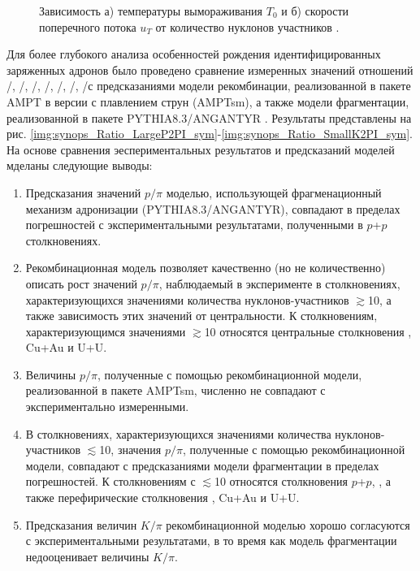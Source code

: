 \begin{figure}[ht]
	\caption{Зависимость а) температуры вымораживания $T_0$ и  б) скорости поперечного потока $u_T$ от количество нуклонов участников \Npart.}\label{fig:synops_T0ut}
\end{figure}
Для более глубокого анализа особенностей рождения идентифицированных заряженных адронов было проведено сравнение измеренных значений отношений  \pim/\pip, \Km/\Kp, \prot/\aprot, \prot/\pip, \aprot/\pim, \Kp/\pip, \Km/\pim с предсказаниями модели рекомбинации, реализованной в пакете AMPT в версии с плавлением струн (AMPTsm)\cite{AMPT}, а также модели фрагментации, реализованной в пакете PYTHIA8.3/ANGANTYR \cite{pythia}.
Результаты представлены на рис. \ref{img:synops_Ratio_LargeP2PI_sym}-\ref{img:synops_Ratio_SmallK2PI_sym}.
На основе сравнения эеспериментальных результатов и предсказаний моделей мделаны следующие выводы:

\begin{enumerate}
	\item Предсказания значений $p/\pi$ моделью, использующей фрагменационный механизм адронизации (PYTHIA8.3/ANGANTYR), совпадают в пределах погрешностей с экспериментальными результатами, полученными в $p$+$p$ столкновениях. 
	\item Рекомбинационная модель позволяет качественно (но не количественно) описать рост значений $p/\pi$, наблюдаемый в эксперименте в столкновениях, характеризующихся значениями количества нуклонов-участников \Npart $\gtrsim$10, а также зависимость этих значений от центральности. К столкновениям, характеризующимся значениями \Npart $\gtrsim$10 относятся центральные столкновения \heau, Cu+Au и U+U.
	\item Величины $p/\pi$, полученные с помощью рекомбинационной модели, реализованной в пакете AMPTsm, численно не совпадают с экспериментально измеренными. 
	\item В столкновениях, характеризующихся значениями количества нуклонов-участников \Npart $\lesssim$10, значения $p/\pi$, полученные с помощью рекомбинационной модели, совпадают с предсказаниями модели фрагментации в пределах погрешностей. К столкновениям с \Npart $\lesssim$10 относятся столкновения $p$+$p$, \pal, а также перефирические столкновения \heau, Cu+Au и U+U.
	\item Предсказания величин $K/\pi$ рекомбинационной моделью хорошо согласуются с экспериментальными результатами, в то время как модель фрагментации недооценивает величины $K/\pi$.
\end{enumerate}

